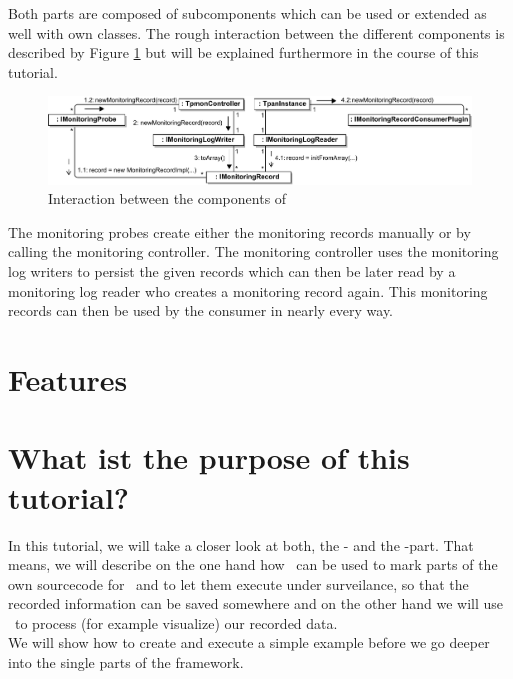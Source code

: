     Both parts are composed of subcomponents which can be used or extended as well with own classes. The rough interaction between the different components is described by Figure \ref{image:interactiondiagramofkieker} but will be explained furthermore in the course of this tutorial.
    \begin{figure}[H]
      \begin{center}
	\includegraphics[width=1.0\textwidth]{kiekerCommunications-revisedReArranged-woMonitoringLog-bw.pdf}
	\caption{Interaction between the components of \Kieker}
	\label{image:interactiondiagramofkieker}
      \end{center}
    \end{figure}
    The monitoring probes create either the monitoring records manually or by calling the monitoring controller. The monitoring controller uses the monitoring log writers to persist the given records which can then be later read by a monitoring log reader who creates a monitoring record again. This monitoring records can then be used by the consumer in nearly every way.

  \section{Features}

  \section{What ist the purpose of this tutorial?}
    In this tutorial, we will take a closer look at both, the \textbf{\KiekerMonitoring}- and the \textbf{\KiekerAnalysis}-part. That means, we will describe on the one hand how \KiekerMonitoring\ can be used to mark parts of the own sourcecode for \Kieker\ and to let them execute under surveilance, so that the recorded information can be saved somewhere and on the other hand we will use \KiekerAnalysis\ to process (for example visualize) our recorded data.\\
    We will show how to create and execute a simple example before we go deeper into the single parts of the framework.